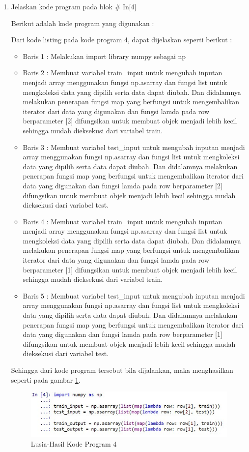 \begin{enumerate}
\item Jelaskan kode program pada blok \# In[4]
	\par Berikut adalah kode program yang digunakan :
	
	\par Dari kode listing pada kode program 4, dapat dijelaskan seperti berikut :
	\begin{itemize}
	\item Baris 1	: Melakukan import library numpy sebagai np
	\item Baris 2	: Membuat variabel train\_input untuk mengubah inputan menjadi array menggunakan fungsi np.asarray dan  fungsi list untuk mengkoleksi data yang dipilih serta data dapat diubah. Dan didalamnya melakukan penerapan fungsi map yang berfungsi untuk mengembalikan iterator dari data yang digunakan dan fungsi lamda pada row berparameter [2] difungsikan untuk membuat objek menjadi lebih kecil sehingga mudah dieksekusi dari variabel train.
	\item Baris 3	: Membuat variabel test\_input untuk mengubah inputan menjadi array menggunakan fungsi np.asarray dan  fungsi list untuk mengkoleksi data yang dipilih serta data dapat diubah. Dan didalamnya melakukan penerapan fungsi map yang berfungsi untuk mengembalikan iterator dari data yang digunakan dan fungsi lamda pada row berparameter [2] difungsikan untuk membuat objek menjadi lebih kecil sehingga mudah dieksekusi dari variabel test.
	\item Baris 4	: Membuat variabel train\_input untuk mengubah inputan menjadi array menggunakan fungsi np.asarray dan  fungsi list untuk mengkoleksi data yang dipilih serta data dapat diubah. Dan didalamnya melakukan penerapan fungsi map yang berfungsi untuk mengembalikan iterator dari data yang digunakan dan fungsi lamda pada row berparameter [1] difungsikan untuk membuat objek menjadi lebih kecil sehingga mudah dieksekusi dari variabel train.
	\item Baris 5	: Membuat variabel test\_input untuk mengubah inputan menjadi array menggunakan fungsi np.asarray dan  fungsi list untuk mengkoleksi data yang dipilih serta data dapat diubah. Dan didalamnya melakukan penerapan fungsi map yang berfungsi untuk mengembalikan iterator dari data yang digunakan dan fungsi lamda pada row berparameter [1] difungsikan untuk membuat objek menjadi lebih kecil sehingga mudah dieksekusi dari variabel test.
	\end{itemize}
	\par Sehingga dari kode program tersebut bila dijalankan, maka menghasilkan seperti pada gambar \ref{7B4}.
		\begin{figure}[!hbtp]
		\centering
		\includegraphics[scale=0.5]{figures/w4.jpg}
		\caption{Lusia-Hasil Kode Program 4}
		\label{7B4}
		\end{figure}
	

\end{enumerate}
